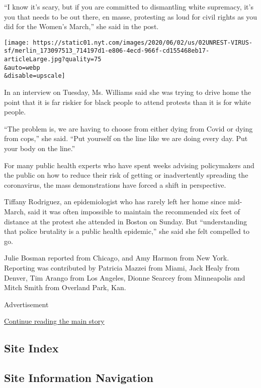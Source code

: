 ``I know it's scary, but if you are committed to dismantling white
supremacy, it's you that needs to be out there, en masse, protesting as
loud for civil rights as you did for the Women's March,'' she said in
the post.

\texttt{[image: https://static01.nyt.com/images/2020/06/02/us/02UNREST-VIRUS-sf/merlin\_173097513\_714197d1-e806-4ecd-966f-cd155468eb17-articleLarge.jpg?quality=75\\\&auto=webp\\\&disable=upscale]}

In an interview on Tuesday, Ms. Williams said she was trying to drive
home the point that it is far riskier for black people to attend
protests than it is for white people.

``The problem is, we are having to choose from either dying from Covid
or dying from cops,'' she said. ``Put yourself on the line like we are
doing every day. Put your body on the line.''

For many public health experts who have spent weeks advising
policymakers and the public on how to reduce their risk of getting or
inadvertently spreading the coronavirus, the mass demonstrations have
forced a shift in perspective.

Tiffany Rodriguez, an epidemiologist who has rarely left her home since
mid-March, said it was often impossible to maintain the recommended six
feet of distance at the protest she attended in Boston on Sunday. But
``understanding that police brutality is a public health epidemic,'' she
said she felt compelled to go.

Julie Bosman reported from Chicago, and Amy Harmon from New York.
Reporting was contributed by Patricia Mazzei from Miami, Jack Healy from
Denver, Tim Arango from Los Angeles, Dionne Searcey from Minneapolis and
Mitch Smith from Overland Park, Kan.

Advertisement

\protect\hyperlink{after-bottom}{Continue reading the main story}

\hypertarget{site-index}{%
\subsection{Site Index}\label{site-index}}

\hypertarget{site-information-navigation}{%
\subsection{Site Information
Navigation}\label{site-information-navigation}}

